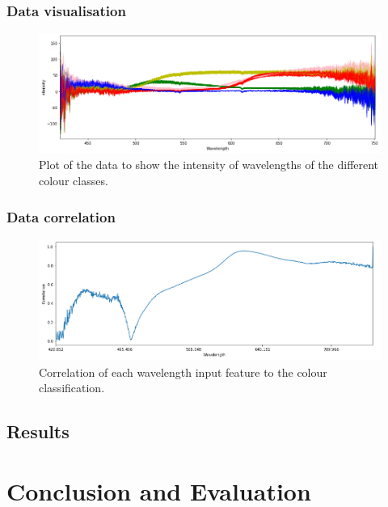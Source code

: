 \documentclass{article}
\begin{document}
\subsubsection{Data visualisation}

\begin{figure}[H]
\centering
\includegraphics[width=1\textwidth, keepaspectratio]{imgs/multiclass-visual.png}
\caption{Plot of the data to show the intensity of wavelengths of the different colour classes.}
\end{figure}

\subsubsection{Data correlation}

\begin{figure}[H]
\centering
\includegraphics[width=1\textwidth, keepaspectratio]{imgs/multiclass-correlation.png}
\caption{Correlation of each wavelength input feature to the colour classification.}
\end{figure}

\subsection{Results}

\section{Conclusion and Evaluation}

\end{document}
